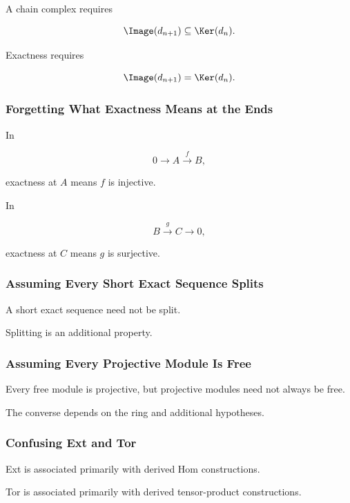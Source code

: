 A chain complex requires

\[ \Image(d_{n+1})\subseteq\Ker(d_n). \]

Exactness requires

\[ \Image(d_{n+1})=\Ker(d_n). \]

\subsubsection{Forgetting What Exactness Means at the Ends}

In

\[ 0\to A\xrightarrow{f}B, \]

exactness at \(A\) means \(f\) is injective.

In

\[ B\xrightarrow{g}C\to0, \]

exactness at \(C\) means \(g\) is surjective.

\subsubsection{Assuming Every Short Exact Sequence Splits}

A short exact sequence need not be split.

Splitting is an additional property.

\subsubsection{Assuming Every Projective Module Is Free}

Every free module is projective, but projective modules need not always be
free.

The converse depends on the ring and additional hypotheses.

\subsubsection{Confusing Ext and Tor}

Ext is associated primarily with derived Hom constructions.

Tor is associated primarily with derived tensor-product constructions.

